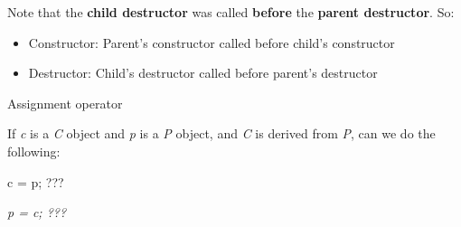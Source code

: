 \documentclass[
]{article}
\providecommand{\tightlist}{%
  \setlength{\itemsep}{0pt}\setlength{\parskip}{0pt}}
\begin{document}
Note that the \textbf{child destructor} was called \textbf{before} the
\textbf{parent destructor}. So:

\begin{itemize}
\tightlist
\item
  Constructor: Parent's constructor called before child's constructor
\item
  Destructor: Child's destructor called before parent's destructor
\end{itemize}

Assignment operator

If \emph{c} is a \emph{C} object and \emph{p} is a \emph{P} object, and
\emph{C} is derived from \emph{P}, can we do the following:

c = p; ???

\emph{p = c; ???}\\
\end{document}
